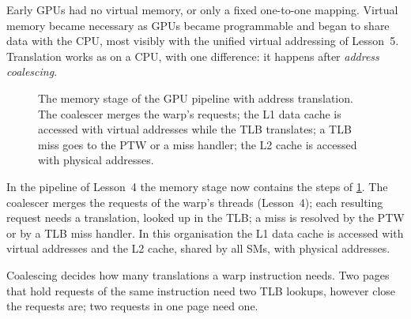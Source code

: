 \documentclass[../main.tex]{subfiles}
\begin{document}
Early GPUs had no virtual memory, or only a fixed one-to-one mapping.
Virtual memory became necessary as GPUs became programmable and began
to share data with the CPU, most visibly with the unified virtual
addressing of Lesson~5.  Translation works
as on a CPU, with one difference: it happens after
\emph{address coalescing}.

\begin{figure}[tb]
  \centering
  
  \caption{The memory stage of the GPU pipeline with address
    translation.  The coalescer merges the warp's requests; the L1
    data cache is accessed with virtual addresses while the TLB
    translates; a TLB miss goes to the PTW or a miss handler; the L2
    cache is accessed with physical addresses.}
  \label{fig:l07-gpu-mmu}
\end{figure}

In the pipeline of Lesson~4 the memory stage now contains the steps of
\cref{fig:l07-gpu-mmu}.  The coalescer merges the requests of the
warp's threads (Lesson~4); each resulting request needs a translation,
looked up in the TLB; a miss is resolved by the PTW or by a TLB miss
handler.  In this organisation the L1 data cache is accessed with
virtual addresses and the L2 cache, shared by all SMs, with physical
addresses.

Coalescing decides how many translations a warp instruction needs.
Two pages that hold requests of the same instruction need two TLB
lookups, however close the requests are; two requests in one page need
one.
\end{document}
